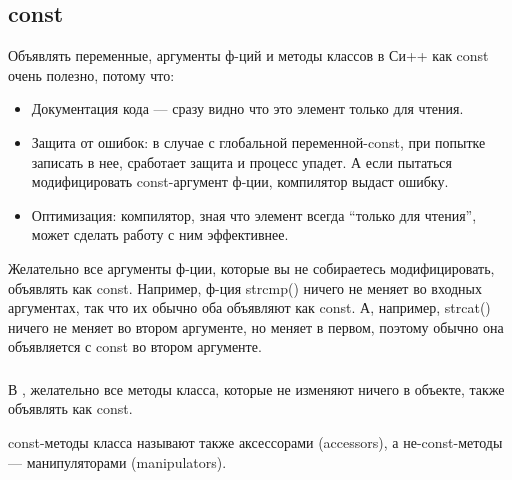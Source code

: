 ﻿\subsection{const}

Объявлять переменные, аргументы ф-ций и методы классов в Си++ как const очень полезно, потому что:

\begin{itemize}
\item
Документация кода --- сразу видно что это элемент только для чтения.

\item
Защита от ошибок: в случае с глобальной переменной-const, при попытке записать в нее, 
сработает защита и процесс упадет.
А если пытаться модифицировать const-аргумент ф-ции, компилятор выдаст ошибку.

\item
Оптимизация: компилятор, зная что элемент всегда ``только для чтения'', может сделать работу с ним эффективнее.
\end{itemize}

Желательно все аргументы ф-ции, которые вы не собираетесь модифицировать, объявлять как const.
Например, ф-ция strcmp() ничего не меняет во входных аргументах, так что их обычно оба объявляют как const.
А, например, strcat() ничего не меняет во втором аргументе, но меняет в первом, поэтому обычно она объявляется
с const во втором аргументе.

\subsubsection{\CPP}

В \CPP, желательно все методы класса, которые не изменяют ничего в объекте, 
также объявлять как const.

const-методы класса называют также аксессорами (accessors), 
а не-const-методы --- манипуляторами (manipulators)\cite{Lakos}.
